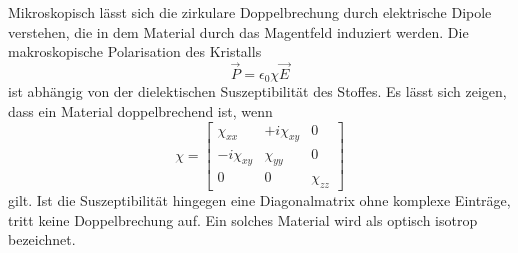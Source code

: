 \noindent
Mikroskopisch lässt sich die zirkulare Doppelbrechung durch elektrische Dipole verstehen, die in dem Material durch das 
Magentfeld induziert werden. Die makroskopische Polarisation des Kristalls 
\begin{equation*}
    \vec{P}=\epsilon_0\chi\vec{E}
\end{equation*}
ist abhängig von der dielektischen Suszeptibilität des Stoffes. Es lässt sich zeigen, dass ein Material doppelbrechend ist, wenn
\begin{equation}
    \chi=
    \left[
        \begin{array}{ccc}
        \chi_{xx}          & +i\chi_{xy} & 0         \\ 
        -i\chi_{xy}   & \chi_{yy}        & 0         \\
        0                  & 0                & \chi_{zz}
    \end{array}
    \right]
    \label{eqn:chi}
\end{equation}
gilt. Ist die Suszeptibilität hingegen eine Diagonalmatrix ohne komplexe Einträge, tritt keine Doppelbrechung auf. Ein solches 
Material wird als optisch isotrop bezeichnet. 

